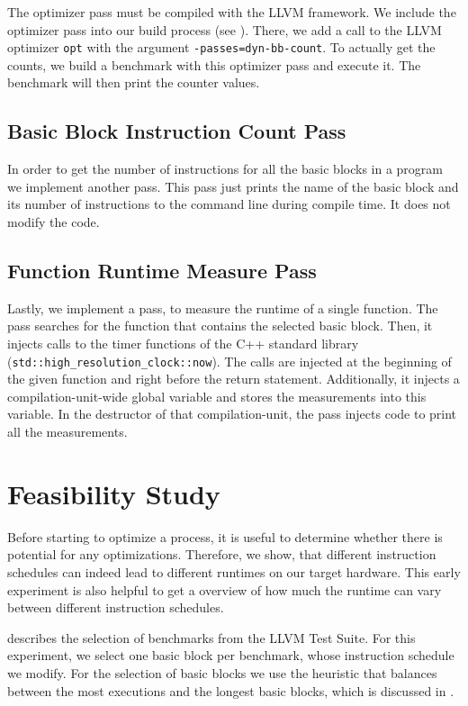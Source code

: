 The optimizer pass must be compiled with the LLVM framework.
We include the optimizer pass into our build process (see ).
There, we add a call to the LLVM optimizer \lstinline{opt} with the argument \mbox{\lstinline{-passes=dyn-bb-count}}.
To actually get the counts, we build a benchmark with this optimizer pass and execute it.
The benchmark will then print the counter values.

\subsection{Basic Block Instruction Count Pass}
\label{sec:approach:instr-count}
In order to get the number of instructions for all the basic blocks in a program we implement another pass.
This pass just prints the name of the basic block and its number of instructions to the command line during compile time.
It does not modify the code.

\subsection{Function Runtime Measure Pass}
Lastly, we implement a pass, to measure the runtime of a single function.
The pass searches for the function that contains the selected basic block.
Then, it injects calls to the timer functions of the C++ standard library (\lstinline|std::high_resolution_clock::now|).
The calls are injected at the beginning of the given function and right before the return statement.
Additionally, it injects a compilation-unit-wide global variable and stores the measurements into this variable.
In the destructor of that compilation-unit, the pass injects code to print all the measurements.

\section{Feasibility Study}
\label{sec:eval:validation}
Before starting to optimize a process, it is useful to determine whether there is potential for any optimizations.
Therefore, we show, that different instruction schedules can indeed lead to different runtimes on our target hardware.
This early experiment is also helpful to get a overview of how much the runtime can vary between different instruction schedules.

 describes the selection of benchmarks from the LLVM Test Suite.
For this experiment, we select one basic block per benchmark, whose instruction schedule we modify.
For the selection of basic blocks we use the heuristic that balances between the most executions and the longest basic blocks, which is discussed in .

